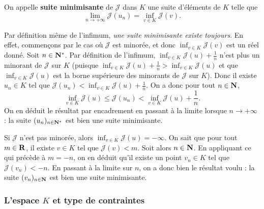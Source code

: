 \documentclass[grape]{../ceri/sty/MasterNotes}
\newcommand\J{\mathcal J}
\begin{document}
\begin{defin}
    On appelle \textbf{suite minimisante} de $\J$ dans $K$ une suite d'éléments de $K$ telle que
    \[ \lim_{n\to+\infty}\J(u_n) = \inf_{v\in K}\J(v). \]
\end{defin}

Par définition même de l'infimum, \textit{une suite minimisante existe toujours}. En effet, commençons par le cas où $\J$ est minorée, et donc $\displaystyle\inf_{v\in K}\J(v)$ est un réel donné. Soit $n\in\mathbf{N}^*$. Par définition de l'infimum, $\displaystyle\inf_{v\in K}\J(u)+\frac 1n$ n'est plus un minorant de $\J$ sur $K$ (puisque $\displaystyle\inf_{v\in K}\J(u)+\frac 1n>\inf_{v\in K}\J(u)$ et que $\displaystyle\inf_{v\in K}\J(u)$ est la borne supérieure des minorants de $\J$ sur $K$). Donc il existe $u_n\in K$ tel que $\J(u_n)<\displaystyle\inf_{v\in K}\J(u)+\frac 1n$. On a donc pour tout $n\in\mathbf{N}$,
\[ \inf_{v\in K}\J(u)\le \J(u_n)<\inf_{v\in K}\J(u)+\frac 1n. \]
On en déduit le résultat par encadrement en passant à la limite lorsque $n\to+\infty$ : la suite $(u_n)_{n\in\mathbf{N}^*}$ est bien une suite minimisante.

Si $\J$ n'est pas minorée, alors $\displaystyle\inf_{v\in K}\J(u)=-\infty$. On sait que pour tout $m\in\mathbf{R}$, il existe $v\in K$ tel que $\J(v)<m$. Soit alors $n\in\mathbf{N}$. En appliquant ce qui précède à $m=-n$, on en déduit qu'il existe un point $v_n\in K$ tel que $\J(v_n)<-n$. En passant à la limite sur $n$, on a donc bien le résultat voulu : la suite $(v_n)_{n\in\mathbf{N}}$ est bien une suite minimisante.

\subsubsection{L'espace $K$ et type de contraintes}
\end{document}
